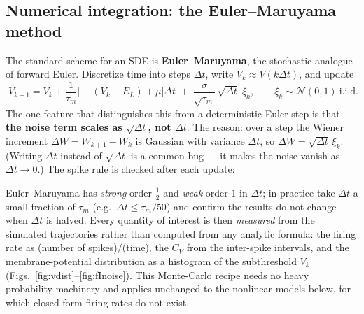 \documentclass[11pt]{article}
\begin{document}
\subsection{Numerical integration: the Euler--Maruyama method}
The standard scheme for an SDE is \textbf{Euler--Maruyama}, the stochastic analogue of forward
Euler. Discretize time into steps $\Delta t$, write $V_k\approx V(k\Delta t)$, and update
\begin{equation}
  \boxed{\;V_{k+1}=V_k+\frac{1}{\tau_m}\big[-(V_k-E_L)+\mu\big]\Delta t
   \;+\;\frac{\sigma}{\sqrt{\tau_m}}\,\sqrt{\Delta t}\;\xi_k,\qquad
   \xi_k\sim\mathcal N(0,1)\ \text{i.i.d.}\;}
  \label{eq:em}
\end{equation}
The one feature that distinguishes this from a deterministic Euler step is that \textbf{the noise
term scales as $\sqrt{\Delta t}$, not $\Delta t$}. The reason: over a step the Wiener increment
$\Delta W=W_{k+1}-W_k$ is Gaussian with variance $\Delta t$, so $\Delta W=\sqrt{\Delta t}\,\xi_k$.
(Writing $\Delta t$ instead of $\sqrt{\Delta t}$ is a common bug --- it makes the noise vanish as
$\Delta t\to0$.) The spike rule is checked after each update:
\begin{center}
\end{center}
Euler--Maruyama has \emph{strong} order $\tfrac12$ and \emph{weak} order $1$ in $\Delta t$; in
practice take $\Delta t$ a small fraction of $\tau_m$ (e.g.\ $\Delta t\le\tau_m/50$) and confirm the
results do not change when $\Delta t$ is halved. Every quantity of interest is then \emph{measured}
from the simulated trajectories rather than computed from any analytic formula: the firing rate as
(number of spikes)$/$(time), the $C_V$ from the inter-spike intervals, and the membrane-potential
distribution as a histogram of the subthreshold $V_k$ (Figs.~\ref{fig:vdist}--\ref{fig:fInoise}).
This Monte-Carlo recipe needs no heavy probability machinery and applies unchanged to the nonlinear
models below, for which closed-form firing rates do not exist.
\end{document}
